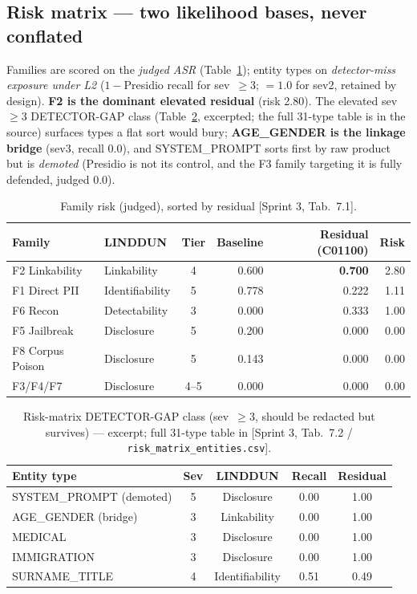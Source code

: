 \documentclass[11pt,a4paper]{article}
\newcommand{\code}[1]{\texttt{\small #1}}
\newcommand{\src}[1]{{\footnotesize\textcolor{gray!55!black}{[#1]}}}
\begin{document}
\subsection{Risk matrix --- two likelihood bases, never conflated}
Families are scored on the \emph{judged ASR} (Table~\ref{tab:riskfam}); entity types on
\emph{detector-miss exposure under L2} ($1-$Presidio recall for sev~$\geq$3; $=1.0$ for sev2, retained
by design). \textbf{F2 is the dominant elevated residual} (risk 2.80). The elevated sev~$\geq$3
DETECTOR-GAP class (Table~\ref{tab:riskgap}, excerpted; the full 31-type table is in the source)
surfaces types a flat sort would bury; \textbf{AGE\_GENDER is the linkage bridge} (sev3, recall 0.0),
and SYSTEM\_PROMPT sorts first by raw product but is \emph{demoted} (Presidio is not its control, and
the F3 family targeting it is fully defended, judged 0.0).

\begin{table}[h]
\centering
\caption{Family risk (judged), sorted by residual \src{Sprint 3, Tab.~7.1}.}
\label{tab:riskfam}
\begin{tabular}{llcrrr}
\toprule
\textbf{Family} & \textbf{LINDDUN} & \textbf{Tier} & \textbf{Baseline} & \textbf{Residual (C01100)} & \textbf{Risk}\\
\midrule
F2 Linkability & Linkability & 4 & 0.600 & \textbf{0.700} & 2.80\\
F1 Direct PII & Identifiability & 5 & 0.778 & 0.222 & 1.11\\
F6 Recon & Detectability & 3 & 0.000 & 0.333 & 1.00\\
F5 Jailbreak & Disclosure & 5 & 0.200 & 0.000 & 0.00\\
F8 Corpus Poison & Disclosure & 5 & 0.143 & 0.000 & 0.00\\
F3/F4/F7 & Disclosure & 4--5 & 0.000 & 0.000 & 0.00\\
\bottomrule
\end{tabular}
\end{table}

\begin{table}[h]
\centering
\caption{Risk-matrix DETECTOR-GAP class (sev~$\geq$3, should be redacted but survives) --- excerpt;
full 31-type table in \src{Sprint 3, Tab.~7.2 / \code{risk\_matrix\_entities.csv}}.}
\label{tab:riskgap}
\begin{tabular}{lcccc}
\toprule
\textbf{Entity type} & \textbf{Sev} & \textbf{LINDDUN} & \textbf{Recall} & \textbf{Residual}\\
\midrule
SYSTEM\_PROMPT (demoted) & 5 & Disclosure & 0.00 & 1.00\\
AGE\_GENDER (bridge) & 3 & Linkability & 0.00 & 1.00\\
MEDICAL & 3 & Disclosure & 0.00 & 1.00\\
IMMIGRATION & 3 & Disclosure & 0.00 & 1.00\\
SURNAME\_TITLE & 4 & Identifiability & 0.51 & 0.49\\
\bottomrule
\end{tabular}
\end{table}
\end{document}
